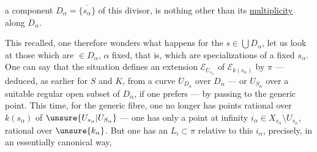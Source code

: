 a component $D_\alpha=\overline{\{s_\alpha\}}$ of this divisor, is nothing other than its \uline{multiplicity} along $D_\alpha$.

This recalled, one therefore wonders what happens for the $s\in\bigcup D_\alpha$,    let us look at those which are $\in D_\alpha$, $\alpha$ fixed, that is, which are specializations of a fixed $s_\alpha$. One can say that the situation defines an extension $\mathcal E_{U_{s_\alpha}}$ of $\mathcal E_{k(s_\alpha)}$ by $\pi$ --- deduced, as earlier for $S$ and $K$, from a  curve $U_{D_\alpha}$ over $D_\alpha$ --- or $U_{S_\alpha}$ over a suitable regular open subset of $D_\alpha$, if one prefers --- by passing to the generic point. This time, for the generic fibre, one no longer has  points rational over $k(s_\alpha)$ of $\unsure{U_{s_\alpha}|U_{S_\alpha}}$ --- one has only a point at infinity $i_\alpha\in X_{s_\alpha}\setminus U_{s_\alpha}$, rational over $\unsure{k_\alpha}$. But one  has an $L_i\subset\pi$ relative to this $i_\alpha$, precisely, in an essentially canonical way,
